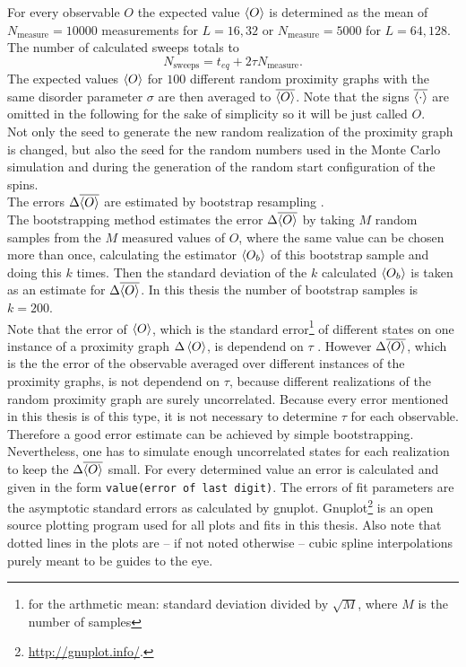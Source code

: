     For every observable \(O\) the expected value \(\left< O \right>\) is determined
    as the mean of \(N_{\mathrm{measure}}=10000\) measurements for \(L=16,32\)
    or \(N_{\mathrm{measure}}=5000\) for \(L=64,128\). The number of
    calculated sweeps totals to
    \[N_{\mathrm{sweeps}}=t_{eq}+2\tau N_{\mathrm{measure}}.\]
    The expected values \(\left< O \right>\) for \(100\) different random proximity
    graphs with the same disorder parameter \(\sigma\) are then averaged to
    \(\overline{\left< O \right>}\). Note that the signs \(\overline{\left< \cdot \right>}\)
    are omitted in the following for the sake of simplicity so
    it will be just called \(O\).\\
    Not only the seed to generate the new random
    realization of the proximity graph is changed, but also the seed for
    the random numbers used in the Monte Carlo simulation and during the
    generation of the random start configuration of the spins.\\
    The errors \(\Delta \overline{\left< O \right>}\) are estimated by bootstrap resampling
    \cite{Bootstrap}.\\
    The bootstrapping method estimates the error \(\Delta \overline{\left< O \right>}\)
    by taking \(M\) random samples from the \(M\) measured values of \(O\),
    where the same value can be chosen more than once, calculating the
    estimator \(\left< O_b \right>\) of this bootstrap sample and doing this \(k\)
    times. Then the standard deviation of the \(k\) calculated \(\left< O_b \right>\)
    is taken as an estimate for \(\Delta \overline{\left< O \right>}\).
    In this thesis the number of bootstrap samples is \(k = 200\).\\
    Note that the error of \(\left< O \right>\), which is the standard error\footnote{for the arthmetic mean: standard deviation divided by \(\sqrt M\), where \(M\) is the number of samples}
    of different states on one instance of a proximity graph \(\Delta \left< O \right>\),
    is dependend on \(\tau\) \cite[p. 151]{Katzgraber2011}.
    However \(\Delta \overline{\left< O \right>}\), which is the the error of the
    observable averaged over different instances of the proximity graphs,
    is not dependend on \(\tau\), because different realizations of the
    random proximity graph are surely uncorrelated.
    Because every error mentioned in this thesis is of this type, it is not
    necessary to determine \(\tau\) for each observable. Therefore a good
    error estimate can be achieved by simple bootstrapping. Nevertheless, one has
    to simulate enough uncorrelated states for each realization to keep
    the \(\Delta \overline{\left< O \right>}\) small. For every determined value an
    error is calculated and given in the form \texttt{value(error of last digit)}.
    The errors of fit parameters are the asymptotic standard errors as calculated
    by gnuplot. Gnuplot\footnote{\url{http://gnuplot.info/}.} is an open
    source plotting program used for all plots and fits in this thesis.
    Also note that dotted lines in the plots are -- if not noted otherwise --
    cubic spline interpolations purely meant to be guides to the eye.

